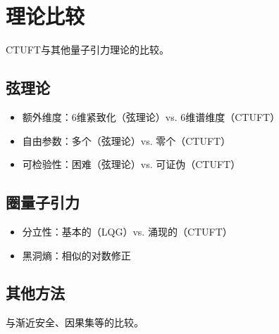 \section{理论比较}
\label{sec:theory_comparison}

CTUFT与其他量子引力理论的比较。

\subsection{弦理论}

\begin{itemize}
    \item 额外维度：6维紧致化（弦理论）vs. 6维谱维度（CTUFT）
    \item 自由参数：多个（弦理论）vs. 零个（CTUFT）
    \item 可检验性：困难（弦理论）vs. 可证伪（CTUFT）
\end{itemize}

\subsection{圈量子引力}

\begin{itemize}
    \item 分立性：基本的（LQG）vs. 涌现的（CTUFT）
    \item 黑洞熵：相似的对数修正
\end{itemize}

\subsection{其他方法}

与渐近安全、因果集等的比较。
